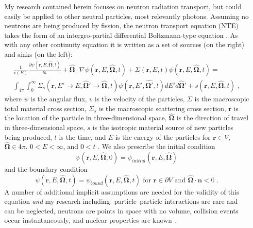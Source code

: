 My research contained herein focuses on neutron radiation transport, but could easily be applied to other neutral particles, most relevantly photons.
Assuming no neutrons are being produced by fission, the neutron transport equation (NTE) takes the form of an intergro-partial differential Boltzmann-type equation \cite{duderstadt_hamilton}.
As with any other continuity equation it is written as a set of sources (on the right) and sinks (on the left):
\begin{multline}
    \label{eq:fullNTE}
    \frac{1}{v(E)}\frac{\partial \psi(\boldsymbol{r}, E, \boldsymbol{\hat{\Omega}},t)}{\partial t} + \boldsymbol{\hat{\Omega}} \cdot \nabla \psi(\boldsymbol{r}, E, \boldsymbol{\hat{\Omega}},t) + \Sigma(\bm{r}, E, t) \psi(\boldsymbol{r}, E, \boldsymbol{\hat{\Omega}},t) = \\
    \int_{4\pi}\int_{0}^{\infty}\Sigma_s(\boldsymbol{r}, E'\rightarrow E, \boldsymbol{\hat{\Omega}'} \rightarrow \boldsymbol{\hat{\Omega}}, t)
    \psi(\boldsymbol{r}, E', \boldsymbol{\hat{\Omega'}},t) dE' d\boldsymbol{\hat{\Omega}'} +
    s(\boldsymbol{r}, E, \boldsymbol{\hat{\Omega}},t) \;,
\end{multline}
where $\psi$ is the angular flux, $v$ is the velocity of the particles, $\Sigma$ is the macroscopic total material cross section, $\Sigma_s$ is the macroscopic scattering cross section, $\boldsymbol{r}$ is the location of the particle in three-dimensional space, $\boldsymbol{\hat{\Omega}}$ is the direction of travel in three-dimensional space, $s$ is the isotropic material source of new particles being produced, $t$ is the time, and $E$ is the energy of the particles for $\boldsymbol{r} \in V$, $\boldsymbol{\hat{\Omega}} \in 4\pi$, $0<E<\infty$, and $0<t$ \cite{duderstadt_hamilton}. We also prescribe the initial condition
\begin{equation}
    \psi(\boldsymbol{r}, E, \boldsymbol{\hat{\Omega}},0) = \psi_{initial}(\boldsymbol{r}, E, \boldsymbol{\hat{\Omega}})
\end{equation}
and the boundary condition
\begin{equation}
    \psi(\boldsymbol{r}, E, \boldsymbol{\hat{\Omega}},t) = \psi_{bound}(\boldsymbol{r}, E, \boldsymbol{\hat{\Omega}},t) \text{ for } \boldsymbol{r} \in \partial V \text{ and } \boldsymbol{\hat{\Omega}} \cdot \boldsymbol{n} < 0 \;.
\end{equation}
A number of additional implicit assumptions are needed for the validity of this equation \textit{and} my research including: particle--particle interactions are rare and can be neglected, neutrons are points in space with no volume, collision events occur instantaneously, and nuclear properties are known \cite{lewis_computational_1984, duderstadt_hamilton, adams_fast_2002}.

